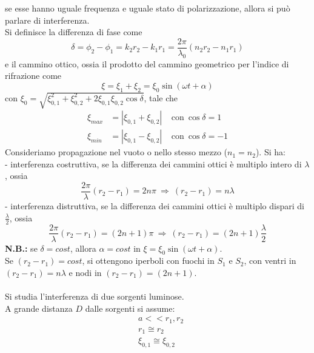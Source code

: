 \documentclass{article}
\begin{document}
se esse hanno uguale frequenza e uguale stato di polarizzazione, allora si può parlare di interferenza.\\
Si definisce la differenza di fase come
\begin{equation}
    \delta=\phi_2-\phi_1=k_2r_2-k_1r_1=\frac{2\pi}{\lambda_0}(n_2r_2-n_1r_1)
    \nonumber
\end{equation}
e il cammino ottico, ossia il prodotto del cammino geometrico per l'indice di rifrazione come
\begin{equation}
    \xi=\xi_1+\xi_2=\xi_0\sin(\omega t+\alpha)
    \nonumber
\end{equation}
con $\xi_0=\sqrt{\xi_{0,1}^2+\xi_{0,2}^2 +2\xi_{0,1}\xi_{0,2}\cos\delta}$, tale che 
\begin{equation}
\begin{split}
    \xi_{max}&=|\xi_{0,1}+\xi_{0,2}|\ \ \ \ \ \text{con} \ \cos\delta=1\\
    \xi_{min}&=|\xi_{0,1}-\xi_{0,2}|\ \ \ \ \ \text{con} \ \cos\delta=-1
\nonumber
\end{split}
\end{equation}
Consideriamo propagazione nel vuoto o nello stesso mezzo ($n_1 = n_2$). Si ha:\\
- interferenza costruttiva, se la differenza dei cammini ottici è multiplo intero di $\lambda$, ossia
\begin{equation}
    \frac{2\pi}{\lambda}(r_2-r_1)=2n\pi \ \Rightarrow \ (r_2-r_1)=n\lambda
    \nonumber
\end{equation}
- interferenza distruttiva, se la differenza dei cammini ottici è multiplo dispari di $\frac{\lambda}{2}$, ossia
\begin{equation}
    \frac{2\pi}{\lambda}(r_2-r_1)=(2n+1)\pi \ \Rightarrow \ (r_2-r_1)=(2n+1)\frac{\lambda}{2}
    \nonumber
\end{equation}
\textbf{N.B.:} se $\delta=cost$, allora $\alpha=cost$ in $\xi=\xi_0\sin(\omega t+\alpha)$.\\
Se $(r_2-r_1)=cost$, si ottengono iperboli con fuochi in $S_1$ e $S_2$, con ventri in $(r_2-r_1)=n\lambda$ e nodi in $(r_2-r_1)=(2n+1)$.\\
\\
Si studia l'interferenza di due sorgenti luminose.\\
A grande distanza $D$ dalle sorgenti si assume:
\begin{equation}
\begin{split}
    &a<<r_1,r_2\\
    &r_1\cong r_2 \\
    &\xi_{0,1}\cong \xi_{0,2}
    \nonumber
\end{split}
\end{equation}
\end{document}
